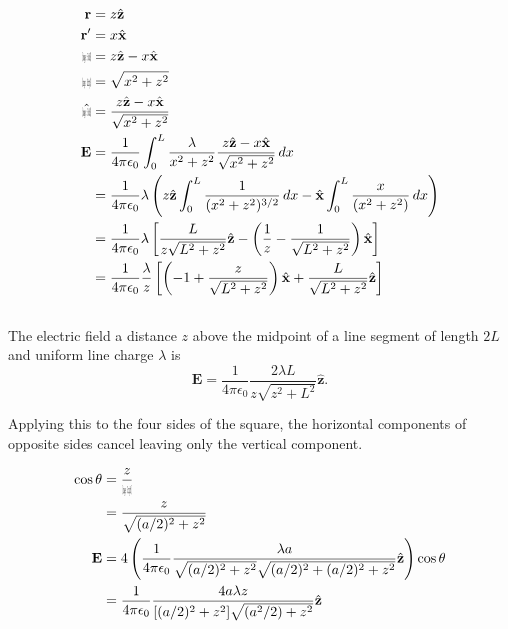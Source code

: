 \documentclass{article}
\renewcommand{\vec}[1]{\boldsymbol{\mathbf{#1}}}
\newcommand{\uvec}[1]{\hat{\vec{#1}}}
\newcommand{\ke}{\frac{1}{4 \pi \epsilon_0}}
\def\rcurs{{\mbox{$\resizebox{.09in}{.08in}{\texttt{[image: ScriptR]}}$}}}
\def\brcurs{{\mbox{$\resizebox{.09in}{.08in}{\texttt{[image: BoldR]}}$}}}
\def\hrcurs{{\mbox{$\hat \brcurs$}}}
\begin{document}
\begin{align*}
  \vec{r}  & = z \uvec{z}                                                                                                                          \\
  \vec{r}' & = x \uvec{x}                                                                                                                          \\
  \brcurs  & = z \uvec{z} - x \uvec{x}                                                                                                             \\
  \rcurs   & = \sqrt{x^2 + z^2}                                                                                                                    \\
  \hrcurs  & = \frac{z \uvec{z} - x \uvec{x}}{\sqrt{x^2 + z^2}}                                                                                    \\
  \vec{E}  & = \ke \int_0^L \frac{\lambda}{x^2 + z^2} \frac{z \uvec{z} - x \uvec{x}}{\sqrt{x^2 + z^2}} \,d x                                       \\
           & = \ke \lambda \left( z \uvec{z} \int_0^L \frac{1}{(x^2 + z^2)^{3 / 2}} \,d x - \uvec{x} \int_0^L \frac{x}{(x^2 + z^2)} \,d x \right)  \\
           & = \ke \lambda \left[ \frac{L}{z \sqrt{L^2 + z^2}} \uvec{z} - \left( \frac{1}{z} - \frac{1}{\sqrt{L^2 + z^2}} \right) \uvec{x} \right] \\
           & = \ke \frac{\lambda}{z} \left[ \left( -1 + \frac{z}{\sqrt{L^2 + z^2}} \right) \uvec{x} + \frac{L}{\sqrt{L^2 + z^2}} \uvec{z} \right]
\end{align*}

\subsection{}

The electric field a distance $z$ above the midpoint of a line segment of length $2 L$ and uniform line charge $\lambda$ is \[\vec{E} = \ke \frac{2 \lambda L}{z \sqrt{z^2 + L^2}} \uvec{z}.\]

Applying this to the four sides of the square, the horizontal components of opposite sides cancel leaving only the vertical component.

\begin{align*}
  \cos \theta & = \frac{z}{\rcurs}                                                                                                      \\
              & = \frac{z}{\sqrt{(a / 2)^2 + z^2}}                                                                                      \\
  \vec{E}     & = 4 \left( \ke \frac{\lambda a}{\sqrt{(a / 2)^2 + z^2} \sqrt{(a / 2)^2 + (a / 2)^2 + z^2}} \uvec{z} \right) \cos \theta \\
              & = \ke \frac{4 a \lambda z}{[(a / 2)^2 + z^2] \sqrt{(a^2 / 2) + z^2}} \uvec{z}
\end{align*}
\end{document}

